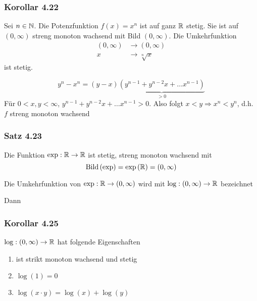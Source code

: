 \subsubsection*{Korollar 4.22}
Sei $n\in\mathbb{N}$. Die Potenzfunktion $f(x)=x^n$ ist auf ganz $\mathbb{R}$ stetig. Sie ist auf $\left( 0,\infty\right)$ streng monoton wachsend mit Bild $\left( 0,\infty\right)$. Die Umkehrfunktion
\begin{align*}
\left( 0,\infty\right)&\to\left( 0,\infty\right)\\
x&\to\sqrt[n]{x}
\end{align*}
ist stetig.

\begin{beweis}{}
\[{y^n} - {x^n} = \left( {y - x} \right)\underbrace {\left( {{y^{n - 1}} + {y^{n - 2}}x +  \ldots {x^{n - 1}}} \right)}_{ > 0}\]
Für $0<x,y<\infty$, ${y^{n - 1}} + {y^{n - 2}}x +  \ldots {x^{n - 1}}>0$.
Also folgt $x<y\Rightarrow x^n<y^n$, d.h. $f$ streng monoton wachsend
\end{beweis}

\subsubsection*{Satz 4.23}
Die Funktion $\exp:\mathbb{R}\to\mathbb{R}$ ist stetig, streng monoton wachsend mit
\[ \operatorname{Bild}\left( \exp\right)=\exp\left( \mathbb{R}\right)=\left( 0,\infty\right)\]

\begin{definition}{4.24}
Die Umkehrfunktion von $\exp:\mathbb{R}\to\left( 0,\infty\right)$ wird mit $\log:\left( 0,\infty\right)\to\mathbb{R}$ bezeichnet
\end{definition}
Dann

\subsubsection*{Korollar 4.25}
$\log:\left( 0,\infty\right)\to\mathbb{R}$ hat folgende Eigenschaften
\begin{enumerate}
\item ist strikt monoton wachsend und stetig
\item $\log(1)=0$
\item $\log\left( x\cdot y\right)=\log(x)+\log\left( y\right)$
\end{enumerate}


